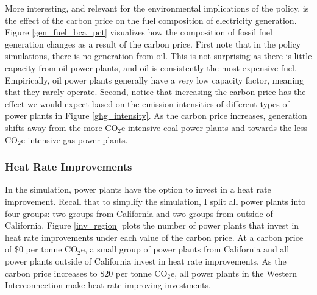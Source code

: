 More interesting, and relevant for the environmental implications of the policy, is the effect of the carbon price on the fuel composition of electricity generation. Figure \ref{gen_fuel_bca_pct} visualizes how the composition of fossil fuel generation changes as a result of the carbon price. First note that in the policy simulations, there is no generation from oil. This is not surprising as there is little capacity from oil power plants, and oil is consistently the most expensive fuel. Empirically, oil power plants generally have a very low capacity factor, meaning that they rarely operate. Second, notice that increasing the carbon price has the effect we would expect based on the emission intensities of different types of power plants in Figure \ref{ghg_intensity}. As the carbon price increases, generation shifts away from the more CO$_2$e intensive coal power plants and towards the less CO$_2$e intensive gas power plants. 




\subsubsection*{Heat Rate Improvements}

In the simulation, power plants have the option to invest in a heat rate improvement. Recall that to simplify the simulation, I split all power plants into four groups: two groups from California and two groups from outside of California. Figure \ref{inv_region} plots the number of power plants that invest in heat rate improvements under each value of the carbon price. At a carbon price of \$0 per tonne CO$_2$e, a small group of power plants from California and all power plants outside of California invest in heat rate improvements. As the carbon price increases to \$20 per tonne CO$_2$e, all power plants in the Western Interconnection make heat rate improving investments. 

